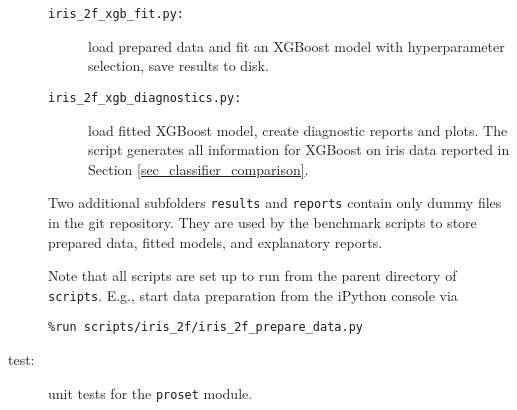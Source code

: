 \begin{description}
\begin{description}
%
\item[\texttt{iris\_2f\_xgb\_fit.py:}] load prepared data and fit an XGBoost model with hyperparameter selection, save results to disk.
%
\item[\texttt{iris\_2f\_xgb\_diagnostics.py:}] load fitted XGBoost model, create diagnostic reports and plots.
The script generates all information for XGBoost on iris data reported in Section \ref{sec_classifier_comparison}.
\end{description}
%
Two additional subfolders \texttt{results} and \texttt{reports} contain only dummy files in the git repository.
They are used by the benchmark scripts to store prepared data, fitted models, and explanatory reports.\par
%
Note that all scripts are set up to run from the parent directory of \texttt{scripts}.
E.g., start data preparation from the iPython console via
%
\begin{center}
\texttt{\%run scripts/iris\_2f/iris\_2f\_prepare\_data.py}
\end{center}
%
\item[test:] unit tests for the \texttt{proset} module.
\end{description}
%
